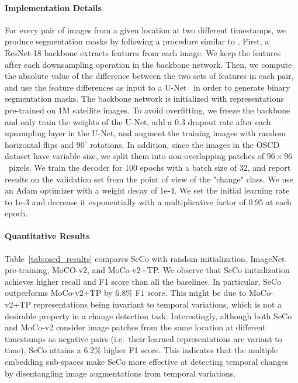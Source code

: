 \documentclass[10pt,twocolumn,letterpaper]{article}
\newcommand{\methodname}[0]{SeCo}
\begin{document}
\vspace{-1em}\paragraph{Implementation Details} For every pair of images from a given location at two different timestamps, we produce segmentation masks by following a procedure similar to \citet{daudt2018fully}. First, a ResNet-18 backbone extracts features from each image. We keep the features after each downsampling operation in the backbone network. Then, we compute the absolute value of the difference between the two sets of features in each pair, and use the feature differences as input to a U-Net~\citep{ronneberger2015u} in order to generate binary segmentation masks. The backbone network is initialized with representations pre-trained on 1M satellite images. To avoid overfitting, we freeze the backbone and only train the weights of the U-Net, add a $0.3$ dropout rate after each upsampling layer in the U-Net, and augment the training images with random horizontal flips and $90^{\circ}$ rotations. In addition, since the images in the OSCD dataset have variable size, we split them into non-overlapping patches of $96 \times 96$~pixels. We train the decoder for 100 epochs with a batch size of 32, and report results on the validation set from the point of view of the "change" class. We use an Adam optimizer with a weight decay of 1e-4. We set the initial learning rate to 1e-3 and decrease it exponentially with a multiplicative factor of 0.95 at each epoch.

\vspace{-1em}\paragraph{Quantitative Results}
Table~\ref{tab:oscd_results} compares \methodname{} with random initialization, ImageNet pre-training, MoCO-v2, and MoCo-v2+TP. We observe that \methodname{} initialization achieves higher recall and F1 score than all the baselines. In particular, \methodname{} outperforms MoCo-v2+TP by 6.8\% F1 score. This might be due to MoCo-v2+TP representations being invariant to temporal variations, which is not a desirable property in a change detection task. Interestingly, although both \methodname{} and MoCo-v2 consider image patches from the same location at different timestamps as negative pairs (i.e.\ their learned representations are variant to time), \methodname{} attains a 6.2\% higher F1 score. This indicates that the multiple embedding sub-spaces make \methodname{} more effective at detecting temporal changes by disentangling image augmentations from temporal variations.
\end{document}
